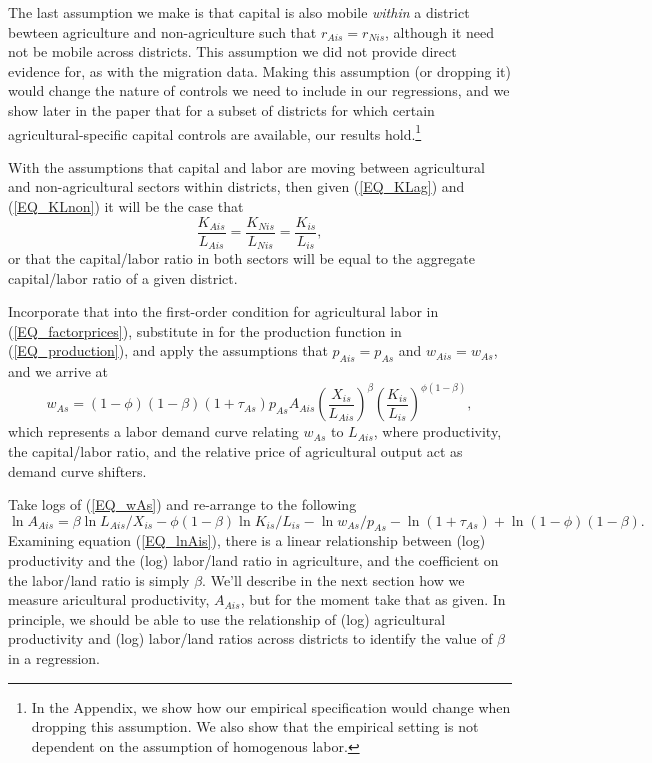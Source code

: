 \documentclass[11pt]{article}
\begin{document}
The last assumption we make is that capital is also mobile \textit{within} a district bewteen agriculture and non-agriculture such that $r_{Ais} = r_{Nis}$, although it need not be mobile across districts. This assumption we did not provide direct evidence for, as with the migration data. Making this assumption (or dropping it) would change the nature of controls we need to include in our regressions, and we show later in the paper that for a subset of districts for which certain agricultural-specific capital controls are available, our results hold.\footnote{In the Appendix, we show how our empirical specification would change when dropping this assumption. We also show that the empirical setting is not dependent on the assumption of homogenous labor.}

With the assumptions that capital and labor are moving between agricultural and non-agricultural sectors within districts, then given (\ref{EQ_KLag}) and (\ref{EQ_KLnon}) it will be the case that
\begin{equation*}
	\frac{K_{Ais}}{L_{Ais}} = \frac{K_{Nis}}{L_{Nis}} = \frac{K_{is}}{L_{is}},
\end{equation*}
or that the capital/labor ratio in both sectors will be equal to the aggregate capital/labor ratio of a given district.

Incorporate that into the first-order condition for agricultural labor in (\ref{EQ_factorprices}), substitute in for the production function in (\ref{EQ_production}), and apply the assumptions that $p_{Ais} = p_{As}$ and $w_{Ais} = w_{As}$, and we arrive at
\begin{equation}
	w_{As} = (1-\phi)(1-\beta) (1+\tau_{As}) p_{As} A_{Ais} \left(\frac{X_{is}}{L_{Ais}}\right)^{\beta} \left(\frac{K_{is}}{L_{is}}\right)^{\phi(1-\beta)}, \label{EQ_wAs}
\end{equation}
which represents a labor demand curve relating $w_{As}$ to $L_{Ais}$, where productivity, the capital/labor ratio, and the relative price of agricultural output act as demand curve shifters. 

Take logs of (\ref{EQ_wAs}) and re-arrange to the following
\begin{equation}
	\ln A_{Ais} = \beta \ln L_{Ais}/X_{is} - \phi(1-\beta) \ln K_{is}/L_{is} - \ln w_{As}/p_{As} - \ln (1+\tau_{As}) + \ln (1-\phi)(1-\beta). \label{EQ_lnAis}
\end{equation}
Examining equation (\ref{EQ_lnAis}), there is a linear relationship between (log) productivity and the (log) labor/land ratio in agriculture, and the coefficient on the labor/land ratio is simply $\beta$. We'll describe in the next section how we measure aricultural productivity, $A_{Ais}$, but for the moment take that as given. In principle, we should be able to use the relationship of (log) agricultural productivity and (log) labor/land ratios across districts to identify the value of $\beta$ in a regression.
\end{document}
